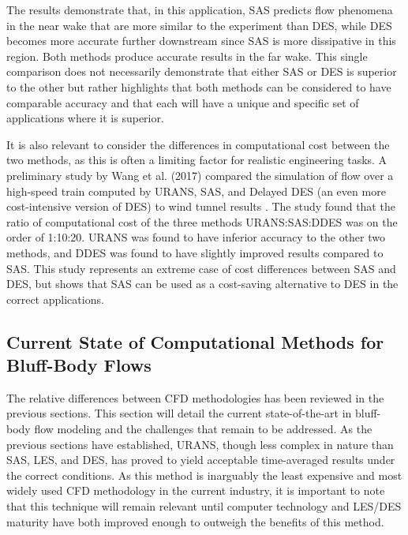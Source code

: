 \documentclass[journal]{new-aiaa}
\begin{document}
The results demonstrate that, in this application, SAS predicts flow phenomena in the near wake that are more similar to the experiment than DES, while DES becomes more accurate further downstream since SAS is more dissipative in this region. Both methods produce accurate results in the far wake. This single comparison does not necessarily demonstrate that either SAS or DES is superior to the other but rather highlights that both methods can be considered to have comparable accuracy and that each will have a unique and specific set of applications where it is superior.






It is also relevant to consider the differences in computational cost between the two methods, as this is often a limiting factor for realistic engineering tasks. A preliminary study by Wang et al. (2017) compared the simulation of flow over a high-speed train computed by URANS, SAS, and Delayed DES (an even more cost-intensive version of DES) to wind tunnel results \cite{wang2017performance}. The study found that the ratio of computational cost of the three methods URANS:SAS:DDES was on the order of 1:10:20. URANS was found to have inferior accuracy to the other two methods, and DDES was found to have slightly improved results compared to SAS. This study represents an extreme case of cost differences between SAS and DES, but shows that SAS can be used as a cost-saving alternative to DES in the correct applications.
















\subsection{Current State of Computational Methods for Bluff-Body Flows} \label{subsec:currentstatenumeric}


The relative differences between CFD methodologies has been reviewed in the previous sections. This section will detail the current state-of-the-art in bluff-body flow modeling and the challenges that remain to be addressed. As the previous sections have established, URANS, though less complex in nature than SAS, LES, and DES, has proved to yield acceptable time-averaged results under the correct conditions. As this method is inarguably the least expensive and most widely used CFD methodology in the current industry, it is important to note that this technique will remain relevant until computer technology and LES/DES maturity have both improved enough to outweigh the benefits of this method.
\end{document}

